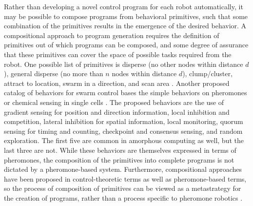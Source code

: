 Rather than developing a novel control program for each robot automatically, it may be possible to compose programs from behavioral primitives, such that some combination of the primitives results in the emergence of the desired behavior. 
A compositional approach to program generation requires the definition of primitives out of which programs can be composed, and some degree of assurance that these primitives can cover the space of possible tasks required from the robot. 
One possible list of primitives is disperse (no other nodes within distance $d$), general disperse (no more than $n$ nodes within distance $d$), clump/cluster, attract to location, swarm in a direction, and scan area \citep{evans2000programming}.
Another proposed catalog of behaviors for swarm control bases the simple behaviors on pheromones or chemical sensing in single cells \citep{nagpal2004catalog}. 
The proposed behaviors are the use of gradient sensing for position and direction information, local inhibition and competition, lateral inhibition for spatial information, local monitoring, quorum sensing for timing and counting, checkpoint and consensus sensing, and random exploration. 
The first five are common in amorphous computing as well, but the last three are not. %
While these behaviors are themselves expressed in terms of pheromones, the composition of the primitives into complete programs is not dictated by a pheromone-based system.
Furthermore, compositional approaches have been proposed in control-theoretic terms as well as pheromone-based terms, so the process of composition of primitives can be viewed as a metastrategy for the creation of programs, rather than a process specific to pheromone robotics \citep{belta2007symbolic}.


